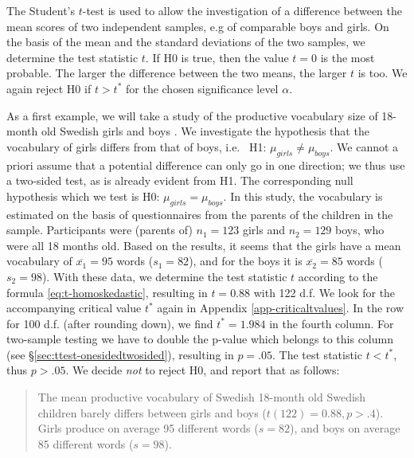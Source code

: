 \documentclass[
]{book}
\begin{document}
The Student's \(t\)-test is used to allow the investigation of a difference
between the mean scores of two independent samples, e.g of
comparable boys and girls. On the basis of the mean and the standard
deviations of the two samples, we determine the test statistic \(t\).
If H0 is true, then the value \(t=0\) is the most probable. The larger the difference
between the two means, the larger \(t\) is too. We again reject H0 if \(t>t^*\)
for the chosen significance level \(\alpha\).

As a first example, we will take a study of the productive vocabulary size
of 18-month old Swedish girls and boys \citep{Ande11}. We investigate the hypothesis
that the vocabulary of girls differs from that of boys, i.e.~
H1: \(\mu_{girls} \ne \mu_{boys}\).
We cannot a priori assume that a potential difference can only go in one direction;
we thus use a two-sided test, as is already evident from H1.
The corresponding null hypothesis which we test is H0: \(\mu_{girls} = \mu_{boys}\).
In this study, the vocabulary is estimated on the basis of questionnaires
from the parents of the children in the sample. Participants were
(parents of) \(n_1=123\) girls and \(n_2=129\) boys, who were all 18 months
old. Based on the results, it seems that the girls have a mean vocabulary
of \(\overline{x_1}=95\) words (\(s_1=82\)), and for the boys it is
\(\overline{x_2}=85\) words (\(s_2=98\)). With these data, we determine the
test statistic \(t\) according to the formula
\eqref{eq:t-homoskedastic}, resulting in \(t=0.88\) with 122 d.f. We look for the
accompanying critical value \(t^*\) again in Appendix
\ref{app-criticaltvalues}. In the row for 100 d.f. (after rounding down),
we find \(t^*=1.984\) in the fourth column. For two-sample testing
we have to double the p-value which belongs to this column
(see §\ref{sec:ttest-onesidedtwosided}), resulting in \(p=.05\). The
test statistic \(t < t^*\), thus \(p>.05\). We decide \emph{not} to reject
H0, and report that as follows:

\begin{quote}
The mean productive vocabulary of Swedish 18-month old Swedish children
barely differs between girls and boys
(\(t(122)=0.88, p>.4\)). Girls produce on average 95 different
words (\(s=82\)), and boys on average 85 different words
(\(s=98\)).
\end{quote}
\end{document}
